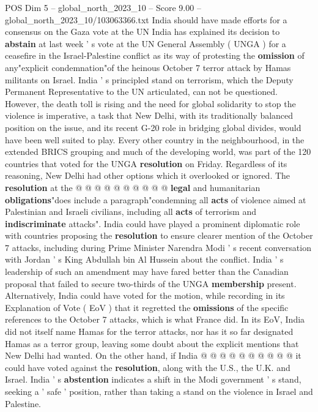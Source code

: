 \begin{textsample}{POS Dim 5 – global\_north\_2023\_10 – Score 9.00 – global\_north\_2023\_10/103063366.txt}  \label{ex:f5_pos_432}
India should have made efforts for a consensus on the Gaza vote at the UN India has explained its decision to \textbf{abstain} at last week ' s vote at the UN General Assembly ( UNGA ) for a ceasefire in the Israel-Palestine conflict as its way of protesting the \textbf{omission} of any"explicit condemnation"of the heinous October 7 terror attack by Hamas militants on Israel.
India ' s principled stand on terrorism, which the Deputy Permanent Representative to the UN articulated, can not be questioned.
However, the death toll is rising and the need for global solidarity to stop the violence is imperative, a task that New Delhi, with its traditionally balanced position on the issue, and its recent G-20 role in bridging global divides, would have been well suited to play.
Every other country in the neighbourhood, in the extended BRICS grouping and much of the developing world, was part of the 120 countries that voted for the UNGA \textbf{resolution} on Friday.
Regardless of its reasoning, New Delhi had other options which it overlooked or ignored.
The \textbf{resolution} at the @ @ @ @ @ @ @ @ @ @ \textbf{legal} and humanitarian \textbf{obligations}"does include a paragraph"condemning all \textbf{acts} of violence aimed at Palestinian and Israeli civilians, including all \textbf{acts} of terrorism and \textbf{indiscriminate} attacks".
India could have played a prominent diplomatic role with countries proposing the \textbf{resolution} to ensure clearer mention of the October 7 attacks, including during Prime Minister Narendra Modi ' s recent conversation with Jordan ' s King Abdullah bin Al Hussein about the conflict.
India ' s leadership of such an amendment may have fared better than the Canadian proposal that failed to secure two-thirds of the UNGA \textbf{membership} present.
Alternatively, India could have voted for the motion, while recording in its Explanation of Vote ( EoV ) that it regretted the \textbf{omissions} of the specific references to the October 7 attacks, which is what France did.
In its EoV, India did not itself name Hamas for the terror attacks, nor has it so far designated Hamas as a terror group, leaving some doubt about the explicit mentions that New Delhi had wanted.
On the other hand, if India @ @ @ @ @ @ @ @ @ @ it could have voted against the \textbf{resolution}, along with the U.S., the U.K. and Israel.
India ' s \textbf{abstention} indicates a shift in the Modi government ' s stand, seeking a ' safe ' position, rather than taking a stand on the violence in Israel and Palestine.

\end{textsample}
